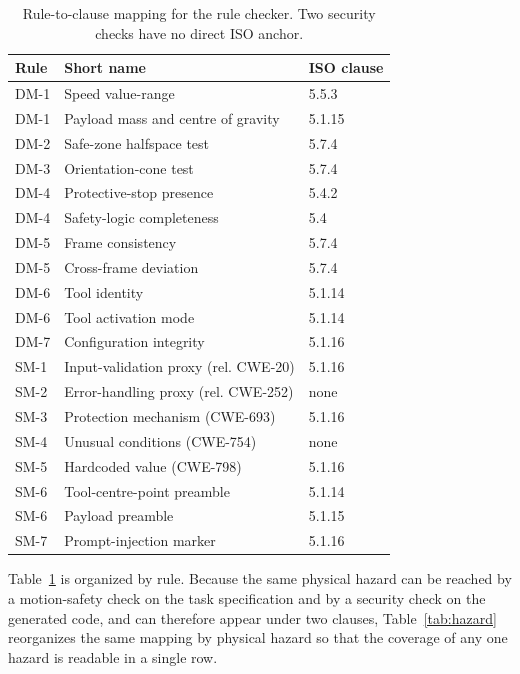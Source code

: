 \documentclass{ieeeaccess}
\begin{document}
\begin{table}[h]
\caption{Rule-to-clause mapping for the rule checker. Two security checks have no
direct ISO anchor.}
\label{tab:iso}
\centering
\footnotesize
\begin{tabular}{@{}p{}p{}p{}@{}}
\toprule
Rule & Short name & ISO clause \\
\midrule
DM-1 & Speed value-range & 5.5.3 \\
DM-1 & Payload mass and centre of gravity & 5.1.15 \\
DM-2 & Safe-zone halfspace test & 5.7.4 \\
DM-3 & Orientation-cone test & 5.7.4 \\
DM-4 & Protective-stop presence & 5.4.2 \\
DM-4 & Safety-logic completeness & 5.4 \\
DM-5 & Frame consistency & 5.7.4 \\
DM-5 & Cross-frame deviation & 5.7.4 \\
DM-6 & Tool identity & 5.1.14 \\
DM-6 & Tool activation mode & 5.1.14 \\
DM-7 & Configuration integrity & 5.1.16 \\
SM-1 & Input-validation proxy (rel. CWE-20) & 5.1.16 \\
SM-2 & Error-handling proxy (rel. CWE-252) & none \\
SM-3 & Protection mechanism (CWE-693) & 5.1.16 \\
SM-4 & Unusual conditions (CWE-754) & none \\
SM-5 & Hardcoded value (CWE-798) & 5.1.16 \\
SM-6 & Tool-centre-point preamble & 5.1.14 \\
SM-6 & Payload preamble & 5.1.15 \\
SM-7 & Prompt-injection marker & 5.1.16 \\
\bottomrule
\end{tabular}
\end{table}

Table~\ref{tab:iso} is organized by rule. Because the same physical hazard can be
reached by a motion-safety check on the task specification and by a security check on the
generated code, and can therefore appear under two clauses, Table~\ref{tab:hazard}
reorganizes the same mapping by physical hazard so that the coverage of any one hazard is
readable in a single row.
\end{document}
